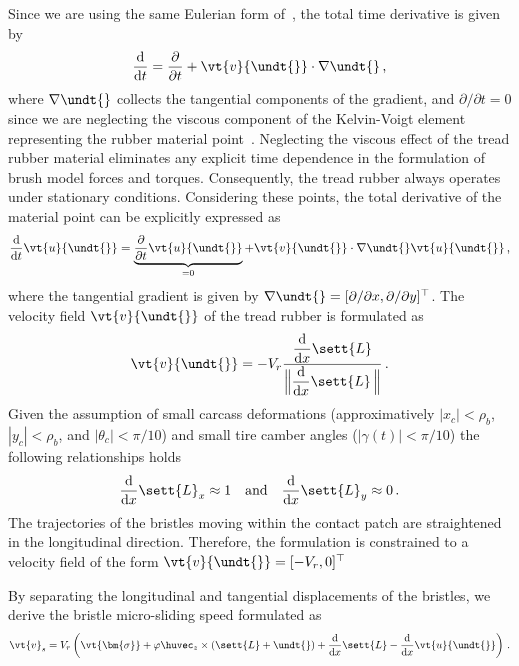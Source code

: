 Since we are using the same Eulerian form of~\cite{romano2022analytical}, the total time derivative is given by
%
\begin{equation*}
  \dfrac{\mathrm{d}}{\mathrm{d}t} =  \dfrac{\partial}{\partial t} + \vt{v}{\undt{}} \cdot\nabla{\undt{}} \, \text{,}
\end{equation*}
%
where $\nabla{\undt{}}$ collects the tangential components of the gradient, and $\partial/\partial t = 0$ since we are neglecting the viscous component of the Kelvin-Voigt element representing the rubber material point~\cite{meyers2008mechanical}. Neglecting the viscous effect of the tread rubber material eliminates any explicit time dependence in the formulation of brush model forces and torques. Consequently, the tread rubber always operates under stationary conditions. Considering these points, the total derivative of the material point can be explicitly expressed as
%
\begin{equation*}
  \dfrac{\mathrm{d}}{\mathrm{d}t}\vt{u}{\undt{}} = \underbrace{\dfrac{\partial}{\partial t}\vt{u}{\undt{}}}_{=0} + \vt{v}{\undt{}}\cdot\nabla{\undt{}}\vt{u}{\undt{}} \, \text{,}
\end{equation*}
%
where the tangential gradient is given by $\nabla{\undt{}} = [\partial/\partial x, \partial/\partial y]^\top$. The velocity field $\vt{v}{\undt{}}$ of the tread rubber is formulated as
%
\begin{equation*}
  \vt{v}{\undt{}} = -V_r \dfrac{\dfrac{\mathrm{d}}{\mathrm{d}x} \sett{L}}{\Big\|\dfrac{\mathrm{d}}{\mathrm{d}x} \sett{L}\,\Big\|} \, \text{.}
\end{equation*}
%
Given the assumption of small carcass deformations (approximatively $|x_c| < \rho_b$, $|y_c| < \rho_b$, and $|\theta_c| < \pi/10$) and small tire camber angles ($|\gamma(t)| < \pi/10$) the following relationships holds~\cite{romano2022advanced}
%
\begin{equation*}
  \dfrac{\mathrm{d}}{\mathrm{d}x} \sett{L}_x \approx 1 \quad \text{and} \quad \dfrac{\mathrm{d}}{\mathrm{d}x} \sett{L}_y \approx 0 \, \text{.}
\end{equation*}
%
The trajectories of the bristles moving within the contact patch are straightened in the longitudinal direction. Therefore, the formulation is constrained to a velocity field of the form $\vt{v}{\undt{}} = [-V_r, 0]^\top$

By separating the longitudinal and tangential displacements of the bristles, we derive the bristle micro-sliding speed formulated as
%
\begin{equation}
  \vt{v}_s = V_r\left( \vt{\bm{\sigma}} + \varphi\huvec_z \times \left(\sett{L} + \undt{}\right) + \dfrac{\mathrm{d}}{\mathrm{d}x}\sett{L} - \dfrac{\mathrm{d}}{\mathrm{d}x}\vt{u}{\undt{}} \right) \, \text{.}
  \label{app3:eq:v_s_int}
\end{equation}


